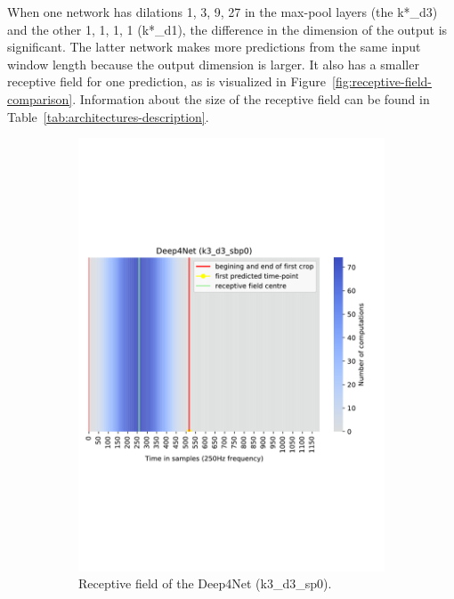 When one network has dilations 1, 3, 9, 27 in the max-pool layers (the k*\_d3) and the other 1, 1, 1, 1 (k*\_d1), the difference in the dimension of the output is significant.
The latter network makes more predictions from the same input window length because the output dimension is larger.
It also has a smaller receptive field for one prediction, as is visualized in Figure~\ref{fig:receptive-field-comparison}.
Information about the size of the receptive field can be found in Table~\ref{tab:architectures-description}.

\begin{figure}[!htpb]
\centering
\begin{subfigure}[b]{0.44\textwidth}
   \includegraphics[width=\linewidth]{img/ch3/deep4net-receptive-field}
   \caption{Receptive field of the Deep4Net (k3\_d3\_sp0).}
\end{subfigure}
\begin{subfigure}[b]{0.44\textwidth}

\end{subfigure}
\end{figure}
